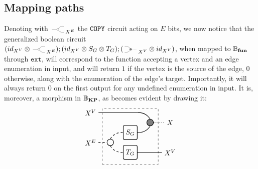 \documentclass[preliminary,copyright,creativecommons,sharealike,noncommercial]{eptcs}
\begin{document}
\subsection{Mapping paths}
%
%
Denoting with $\COPYSym_{X^E}$ the $\texttt{COPY}$ circuit acting 
on $E$ bits, we now notice that the generalized boolean circuit 
$(\Id{X^V} \Tensor \COPYSym_{X^E});(\Id{X^V} 
  \Tensor S_G \Tensor T_G);(\MATCHSym_{X^V} \Tensor \Id{X^V})$,
when mapped to $\mathbb{B}_\textbf{fun}$ through $\texttt{ext}$, will correspond to the 
function accepting a vertex and an edge enumeration in input, and 
will return $1$ if the vertex is the source of the edge, $0$ otherwise,
along with the enumeration of the edge's target.
Importantly, it will always return $0$ on the first output for 
any undefined enumeration in input. It is, moreover, a morphism 
in $\mathbb{B}_\textbf{KP}$, as becomes evident by drawing it:
%
%
\begin{equation*}
  \begin{tikzpicture}
    \node[draw, circle, radius=5pt, thick] (copy) at (-1,0.5) {};
    \node[draw, minimum height=20, minimum width=20, rounded corners=2, thick] (S) at (0,1) {$S_G$};
    \node[draw, minimum height=20, minimum width=20, rounded corners=2, thick] (T) at (0,0) {$T_G$};
    \node[draw, fill=gray, circle, radius=5pt, thick] (mat) at (1,1.5) {};

    \node[draw, dashed, minimum height=80, minimum width=80] (contour) at (0,0.8) {};

    \node (Xv) at (-2,2) {$X^V$};
    \node (Xe) at (-2,0.5) {$X^E$};
    \node (X) at (2,1.5) {$X$};
    \node (Xv2) at (2,0) {$X^V$};

    \draw[-, thick] (Xv) to (10pt,2);
    \draw[bend left, thick] (10pt,2) to (mat.north);
    \draw[bend right, thick] (S.east) to (mat.south);

    \draw[dashed, -, thick] (Xe) to (copy.west);

    \draw[dashed, bend left, thick] (copy.north) to (S.west);
    \draw[dashed, bend right, thick] (copy.south) to (T.west);

    \draw[-, dotted, thick] (mat.east) -- (X);
    \draw[-, thick] (T.east) -- (Xv2.west);
  \end{tikzpicture}
\end{equation*}
%
%
\end{document}
